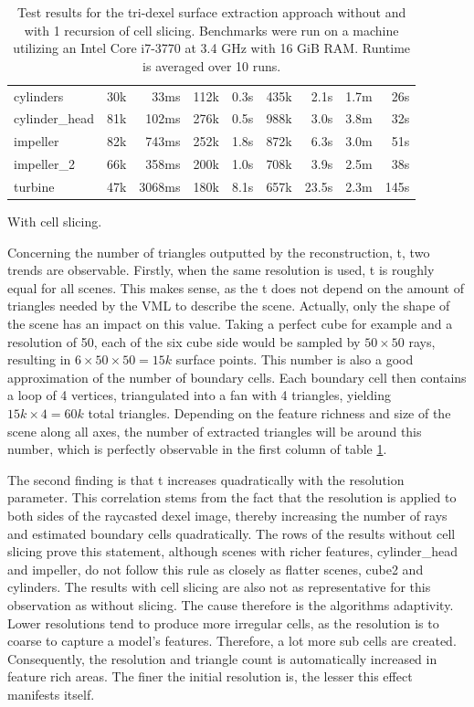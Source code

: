 \begin{table}[!]
\begin{subtable}{\textwidth}
\begin{tabular}{l|rr|rr|rr|rr}
			cylinders      & 30k &   33ms & 112k & 0.3s & 435k &  2.1s & 1.7m &  26s \\
			cylinder\_head & 81k &  102ms & 276k & 0.5s & 988k &  3.0s & 3.8m &  32s \\
			impeller       & 82k &  743ms & 252k & 1.8s & 872k &  6.3s & 3.0m &  51s \\
			impeller\_2    & 66k &  358ms & 200k & 1.0s & 708k &  3.9s & 2.5m &  38s \\
			turbine        & 47k & 3068ms & 180k & 8.1s & 657k & 23.5s & 2.3m & 145s \\
		\end{tabular}
		\caption{
			With cell slicing.
		}
		\label{tbl:tri_dexel_results_slicing}
	\end{subtable}
	\caption{
		Test results for the tri-dexel surface extraction approach without and with 1 recursion of cell slicing.
		Benchmarks were run on a machine utilizing an Intel Core i7-3770 at 3.4 GHz with 16 GiB RAM.
		Runtime is averaged over 10 runs.
	}
	\label{tbl:tri_dexel_results}
\end{table}
%
Concerning the number of triangles outputted by the reconstruction, t, two trends are observable.
Firstly, when the same resolution is used, t is roughly equal for all scenes.
This makes sense, as the t does not depend on the amount of triangles needed by the VML to describe the scene.
Actually, only the shape of the scene has an impact on this value.
Taking a perfect cube for example and a resolution of 50, each of the six cube side would be sampled by $50\times50$ rays, resulting in $6 \times 50 \times 50 = 15k$ surface points.
This number is also a good approximation of the number of boundary cells.
Each boundary cell then contains a loop of 4 vertices, triangulated into a fan with 4 triangles, yielding $15k \times 4 = 60k$ total triangles.
Depending on the feature richness and size of the scene along all axes, the number of extracted triangles will be around this number, which is perfectly observable in the first column of table \ref{tbl:tri_dexel_results}.

The second finding is that t increases quadratically with the resolution parameter.
This correlation stems from the fact that the resolution is applied to both sides of the raycasted dexel image, thereby increasing the number of rays and estimated boundary cells quadratically.
The rows of the results without cell slicing prove this statement, although scenes with richer features, \eg cylinder\_head and impeller, do not follow this rule as closely as flatter scenes, \eg cube2 and cylinders.
The results with cell slicing are also not as representative for this observation as without slicing.
The cause therefore is the algorithms adaptivity.
Lower resolutions tend to produce more irregular cells, as the resolution is to coarse to capture a model's features.
Therefore, a lot more sub cells are created.
Consequently, the resolution and triangle count is automatically increased in feature rich areas.
The finer the initial resolution is, the lesser this effect manifests itself.

